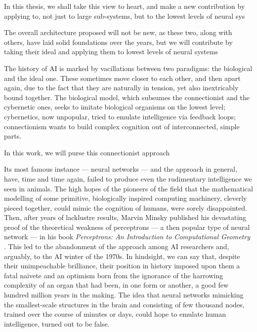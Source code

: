In this thesis, we shall take this view to heart, and make a new contribution by applying to, not just to large sub-systems, but to the lowest levels of neural sys

The overall architecture proposed will not be new, as these two, along with others, have laid solid foundations over the years, but we will contribute by taking their ideal and applying them to lowest levels of neural systems 

The history of AI is marked by vacillations between two paradigms: the biological and the ideal one. These sometimes move closer to each other, and then apart again, due to the fact that they are naturally in tension, yet also inextricably bound together. The biological model, which subsumes the connectionist and the cybernetic ones, seeks to imitate biological organisms on the lowest level; cybernetics, now unpopular, tried to emulate intelligence via feedback loops; connectionism wants to  build complex cognition out of interconnected, simple parts.

In this work, we will purse this connectionist approach




Its most famous instance --- neural networks --- and the approach in general, have, time and time again, failed to produce even the rudimentary intelligence we seen in animals. The high hopes of the pioneers of the field that the mathematical modelling of some primitive, biologically inspired computing machinery, cleverly pieced together, could mimic the cognition of humans, were sorely disappointed. Then, after years of lacklustre results, Marvin Minsky published his devastating proof of the theoretical weakness of perceptrons --- a then popular type of neural network --- in his book {\em Perceptrons: An Introduction to Computational Geometry} \cite{Minsky1988}. This led to the abandonment of the approach among AI researchers and, arguably, to the AI winter of the 1970s. In hindsight, we can say that, despite their unimpeachable brilliance, their position in history imposed upon them a fatal naivete and an optimism born from the ignorance of the harrowing complexity of an organ that had been, in one form or another, a good few hundred million years in the making. The idea that neural networks mimicking the smallest-scale structures in the brain and consisting of few thousand nodes, trained over the course of minutes or days, could hope to emulate human intelligence, turned out to be false.

